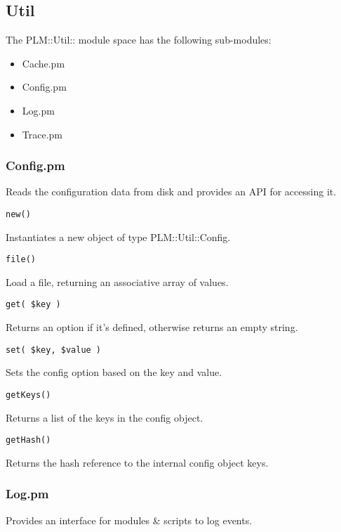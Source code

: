 \subsection{Util}
The PLM::Util:: module space has the following sub-modules:

\begin{itemize}
\item Cache.pm
\item Config.pm
\item Log.pm
\item Trace.pm
\end{itemize}

\subsubsection{Config.pm}
Reads the configuration data from disk and provides an API for accessing it.

\begin{verbatim}
new()
\end{verbatim}
Instantiates a new object of type PLM::Util::Config.

\begin{verbatim}
file()
\end{verbatim}
Load a file, returning an associative array of values.

\begin{verbatim}
get( $key )
\end{verbatim}
Returns an option if it's defined, otherwise returns an empty string.

\begin{verbatim}
set( $key, $value )
\end{verbatim}
Sets the config option based on the key and value.

\begin{verbatim}
getKeys()
\end{verbatim}
Returns a list of the keys in the config object.

\begin{verbatim}
getHash()
\end{verbatim}
Returns the hash reference to the internal config object keys.

\subsubsection{Log.pm}
Provides an interface for modules \& scripts to log events.

